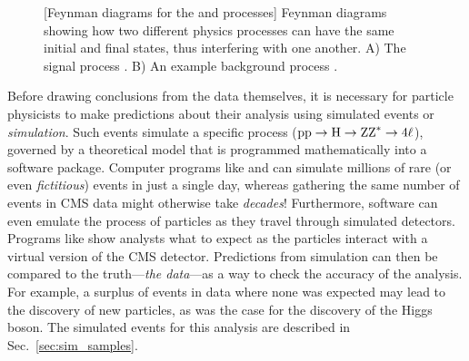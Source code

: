 \begin{figure}[ht]
		[Feynman diagrams for the \gghzzfourl and \ggzzstarfourl processes]
		{Feynman diagrams showing how two different physics processes can have the same initial and final states, thus interfering with one another.
		\;A) The signal process \gghzzfourl.
		\;B) An example background process \ggzzfourl.}
	\label{fig:feyndiag_sig_vs_bkg}
\end{figure}

Before drawing conclusions from the data themselves, it is necessary for particle physicists to make predictions about their analysis using simulated events or \emph{simulation}.
Such events simulate a specific process (\eg $\mathrm{p} \mathrm{p} \to \mathrm{H} \to \text{Z}\text{Z}^{\ast} \to 4\ell$), governed by a theoretical model that is programmed mathematically into a software package.
Computer programs like \MGvATNLO and \POWHEG can simulate millions of rare (or even \emph{fictitious}) events in just a single day, whereas gathering the same number of events in CMS data might otherwise take \emph{decades}!
Furthermore, software can even emulate the process of particles as they travel through simulated detectors.
Programs like \GEANTfour show analysts what to expect as the particles interact with a virtual version of the CMS detector.
Predictions from simulation can then be compared to the truth---\emph{the data}---as a way to check the accuracy of the analysis.
For example, a surplus of events in data where none was expected may lead to the discovery of new particles, as was the case for the discovery of the Higgs boson.
The simulated events for this analysis are described in Sec.~\ref{sec:sim_samples}.

